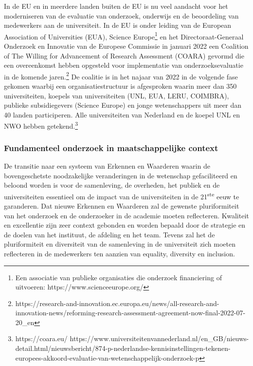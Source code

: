 \documentclass{jote-book}
\begin{document}
	In de EU en in meerdere landen buiten de EU is nu veel aandacht voor het moderniseren van de evaluatie van onderzoek, onderwijs en de beoordeling van medewerkers aan de universiteit. In de EU is onder leiding van de European Association of Universities (EUA), Science Europe\footnote{Een associatie van publieke organisaties die onderzoek financiering of uitvoeren: https://www.scienceeurope.org/} en het Directoraat-Generaal Onderzoek en Innovatie van de Europese Commissie in januari 2022 een Coalition of The Willing for Advancement of Research Assessment (COARA) gevormd die een overeenkomst hebben opgesteld voor implementatie van onderzoeksevaluatie in de komende jaren.\footnote{https://research-and-innovation.ec.europa.eu/news/all-research-and-innovation-news/reforming-research-assessment-agreement-now-final-2022-07-20\_en} De coalitie is in het najaar van 2022 in de volgende fase gekomen waarbij een organisatiestructuur is afgesproken waarin meer dan 350 universiteiten, koepels van universiteiten (UNL, EUA, LERU, COIMBRA), publieke subsidiegevers (Science Europe) en jonge wetenschappers uit meer dan 40 landen participeren. Alle universiteiten van Nederland en de koepel UNL en NWO hebben getekend.\footnote{https://coara.eu/ https://www.universiteitenvannederland.nl/en\_GB/nieuws-detail.html/nieuwsbericht/874-p-nederlandse-kennisinstellingen-tekenen-europees-akkoord-evaluatie-van-wetenschappelijk-onderzoek-p}



	\subsubsection{Fundamenteel onderzoek in maatschappelijke context}



	De transitie naar een systeem van Erkennen en Waarderen waarin de bovengeschetste noodzakelijke veranderingen in de wetenschap gefaciliteerd en beloond worden is voor de samenleving, de overheden, het publiek en de universiteiten essentieel om de impact van de universiteiten in de 21\textsuperscript{ste} eeuw te garanderen. Dat nieuwe Erkennen en Waarderen zal de gewenste pluriformiteit van het onderzoek en de onderzoeker in de academie moeten reflecteren. Kwaliteit en excellentie zijn zeer context gebonden en worden bepaald door de strategie en de doelen van het instituut, de afdeling en het team. Tevens zal het de pluriformiteit en diversiteit van de samenleving in de universiteit zich moeten reflecteren in de medewerkers ten aanzien van equality, diversity en inclusion.
\end{document}
